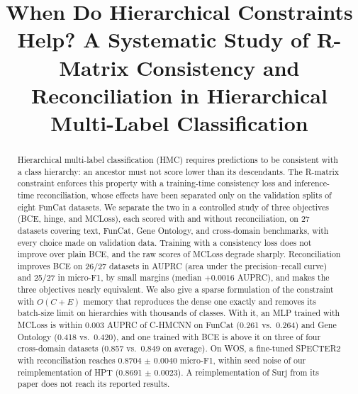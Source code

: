\documentclass[conference]{IEEEtran}
\begin{document}
\title{When Do Hierarchical Constraints Help? A Systematic Study of R-Matrix Consistency and Reconciliation in Hierarchical Multi-Label Classification}

\author{}

\maketitle

\begin{abstract}
Hierarchical multi-label classification (HMC) requires predictions to be
consistent with a class hierarchy: an ancestor must not score lower than its
descendants. The R-matrix constraint enforces this property with a
training-time consistency loss and inference-time reconciliation, whose
effects have been separated only on the validation splits of eight FunCat
datasets. We separate the two in a controlled
study of three objectives (BCE, hinge, and MCLoss), each scored with and
without reconciliation, on 27 datasets covering text, FunCat, Gene Ontology,
and cross-domain benchmarks, with every choice made on validation data.
Training with a consistency loss does not improve over plain BCE, and the raw
scores of MCLoss degrade sharply. Reconciliation improves BCE on 26/27
datasets in AUPRC (area under the precision--recall curve) and 25/27 in
micro-F1, by small margins (median $+0.0016$ AUPRC), and makes the three
objectives nearly equivalent. We also give a sparse formulation of the
constraint with $O(C{+}E)$ memory that reproduces the dense one exactly and
removes its batch-size limit on hierarchies with thousands of classes. With
it, an MLP trained with MCLoss is within 0.003 AUPRC of C-HMCNN on FunCat
(0.261 vs.\ 0.264) and Gene Ontology (0.418 vs.\ 0.420), and one trained with
BCE is above it on three of four cross-domain datasets (0.857 vs.\ 0.849 on
average). On WOS, a fine-tuned
SPECTER2 with reconciliation reaches 0.8704 $\pm$ 0.0040 micro-F1, within
seed noise of our reimplementation of HPT (0.8691 $\pm$ 0.0023). A
reimplementation of Surj from its paper does not reach its reported results.
\end{abstract}
\end{document}

